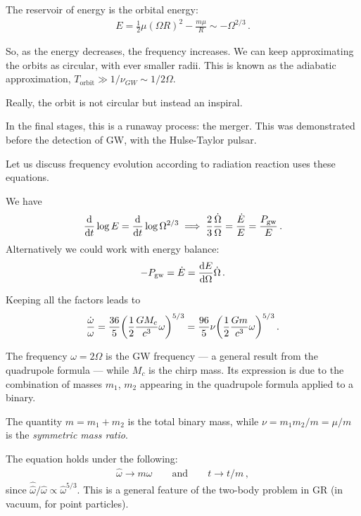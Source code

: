 \documentclass[main.tex]{subfiles}
\begin{document}
The reservoir of energy is the orbital energy: 
%
\begin{align}
E = \frac{1}{2} \mu (\Omega R)^2 - \frac{m \mu }{R} \sim - \Omega^{2/3}
\,.
\end{align}

So, as the energy decreases, the frequency increases. 
We can keep approximating the orbits as circular, with ever smaller radii. 
This is known as the adiabatic approximation, \(T _{\text{orbit}} \gg 1/ \nu_{GW} \sim 1/ 2 \Omega \). 

Really, the orbit is not circular but instead an inspiral. 

In the final stages, this is a runaway process: the merger. 
This was demonstrated before the detection of GW, with the Hulse-Taylor pulsar. 

Let us discuss frequency evolution according to radiation reaction uses these equations.

We have 
%
\begin{align}
\dv{}{t} \log E = \dv{}{t} \log \Omega^{2/3}
\implies
\frac{2}{3} \frac{\dot{\Omega}}{\Omega } = \frac{\dot{E}}{E} = \frac{P _{\text{gw}}}{E}
\,.
\end{align}
%
Alternatively we could work with energy balance: 
%
\begin{align}
- P _{\text{gw}} = \dot{E} = \dv{E}{\Omega } \dot{\Omega}
\,.
\end{align}

Keeping all the factors leads to 
%
\begin{align}
\frac{\dot{\omega}}{\omega } = \frac{36}{5} \qty( \frac{1}{2} \frac{GM_c}{c^3} \omega )^{5/3} = \frac{96}{5} \nu \qty( \frac{1}{2} \frac{Gm}{c^3} \omega )^{5/3}
\,.
\end{align}

The frequency \(\omega = 2 \Omega \) is the GW frequency --- a general result from the quadrupole formula --- while \(M_c\) is the chirp mass. 
Its expression is due to the combination of masses \(m_1 \), \(m_2 \) appearing in the quadrupole formula applied to a binary. 

The quantity \(m = m_1 + m_2  \) is the total binary mass, while \(\nu = m_1 m_2 / m = \mu / m \) is the \emph{symmetric mass ratio}.

The equation holds under the following: 
%
\begin{align}
\hat{\omega} \to m \omega \qquad \text{and} \qquad
t \to t / m
\,,
\end{align}
%
since \(\hat{\hat{\omega}} / \hat{\omega} \propto \hat{\omega}^{5/3}\). 
This is a general feature of the two-body problem in GR (in vacuum, for point particles). 
\end{document}
